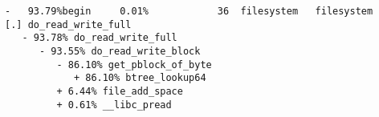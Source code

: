 \begin{lstlisting}[language={},basicstyle=\tiny,caption={perf sample},label={fig_perf_sample}]
-   93.79%begin     0.01%            36  filesystem   filesystem            [.] do_read_write_full
   - 93.78% do_read_write_full
      - 93.55% do_read_write_block
         - 86.10% get_pblock_of_byte
            + 86.10% btree_lookup64
         + 6.44% file_add_space
         + 0.61% __libc_pread
\end{lstlisting}
